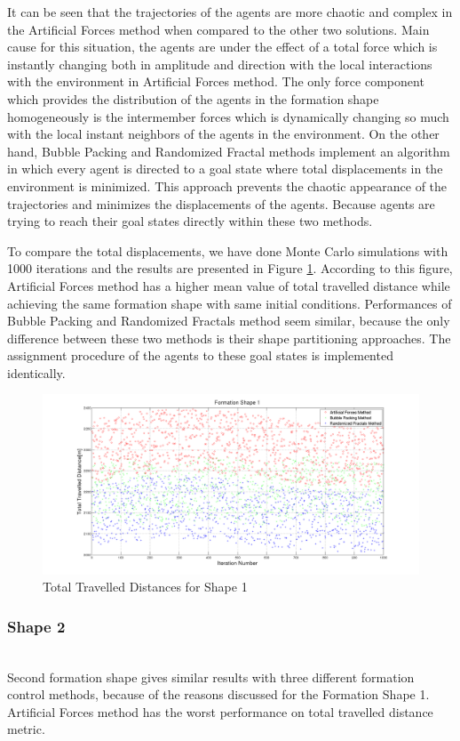 It can be seen that the trajectories of the agents are more chaotic and complex in the Artificial Forces method when compared to the other two solutions. Main cause for this situation, the agents are under the effect of a total force which is instantly changing both in amplitude and direction with the local interactions with the environment in Artificial Forces method. The only force component which provides the distribution of the agents in the formation shape homogeneously is the intermember forces which is dynamically changing so much with the local instant neighbors of the agents in the environment. On the other hand, Bubble Packing and Randomized Fractal methods implement an algorithm in which every agent is directed to a goal state where total displacements in the environment is minimized. This approach prevents the chaotic appearance of the trajectories and minimizes the displacements of the agents. Because agents are trying to reach their goal states directly within these two methods. 

To compare the total displacements, we have done Monte Carlo simulations with 1000 iterations and the results are presented in Figure \ref{total_disp_1}. According to this figure, Artificial Forces method has a higher mean value of total travelled distance while achieving the same formation shape with same initial conditions. Performances of Bubble Packing and Randomized Fractals method seem similar, because the only difference between these two methods is their shape partitioning approaches. The assignment procedure of the agents to these goal states is implemented identically. 
		
\begin{figure}[H]
\caption{Total Travelled Distances for Shape 1} \label{total_disp_1}
\centerline{\includegraphics[scale = 0.32]{Total_Energy_Shape_1}}
\end{figure} 	
				
\subsubsection{Shape 2}\hspace{0pt} \\
Second formation shape gives similar results with three different formation control methods, because of the reasons discussed for the Formation Shape 1. Artificial Forces method has the worst performance on total travelled distance metric. 

